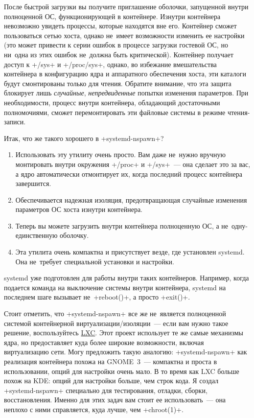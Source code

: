 \documentclass[10pt,oneside,a4paper]{article}
\begin{document}
После быстрой загрузки вы получите приглашение оболочки, запущенной внутри
полноценной ОС, функционирующей в контейнере. Изнутри контейнера невозможно
увидеть процессы, которые находятся вне его. Контейнер сможет пользоваться сетью
хоста, однако не~имеет возможности изменить ее настройки (это может привести к
серии ошибок в процессе загрузки гостевой ОС, но ни~одна из этих ошибок
не~должна быть критической). Контейнер получает доступ к +/sys+ и +/proc/sys+,
однако, во избежание вмешательства контейнера в конфигурацию ядра и аппаратного
обеспечения хоста, эти каталоги будут смонтированы только для чтения. Обратите
внимание, что эта защита блокирует лишь \emph{случайные}, \emph{непредвиденные}
попытки изменения параметров. При необходимости, процесс внутри контейнера,
обладающий достаточными полномочиями, сможет перемонтировать эти файловые
системы в режиме чтения-записи.

Итак, что же такого хорошего в +systemd-nspawn+?
\begin{enumerate}
	\item Использовать эту утилиту очень просто. Вам даже не~нужно вручную монтировать
		внутри окружения +/proc+ и +/sys+~--- она сделает это за вас, а
		ядро автоматически отмонтирует их, когда последний процесс
		контейнера завершится.
	\item Обеспечивается надежная изоляция, предотвращающая случайные
		изменения параметров ОС хоста изнутри контейнера.
	\item Теперь вы можете загрузить внутри контейнера полноценную ОС, а
		не~одну-единственную оболочку.
	\item Эта утилита очень компактна и присутствует везде, где установлен
		systemd. Она не~требует специальной установки и настройки.
\end{enumerate}

systemd уже подготовлен для работы внутри таких контейнеров. Например, когда
подается команда на выключение системы внутри контейнера, systemd на последнем
шаге вызывает не~+reboot()+, а просто +exit()+.

Стоит отметить, что +systemd-nspawn+ все же не~является полноценной системой
контейнерной виртуализации/изоляции~--- если вам нужно такое решение,
воспользуйтесь \href{ http://lxc.sourceforge.net/}{LXC}. Этот проект использует
те же самые механизмы ядра, но предоставляет куда более широкие возможности,
включая виртуализацию сети. Могу предложить такую аналогию: +systemd-nspawn+ как
реализация контейнера похожа на GNOME~3~--- компактна и проста в использовании,
опций для настройки очень мало. В то время как LXC больше похож на KDE: опций
для настройки больше, чем строк кода. Я создал +systemd-nspawn+ специально для
тестирования, отладки, сборки, восстановления. Именно для этих задач вам стоит
ее использовать~--- она неплохо с ними справляется, куда лучше, чем +chroot(1)+.
\end{document}
